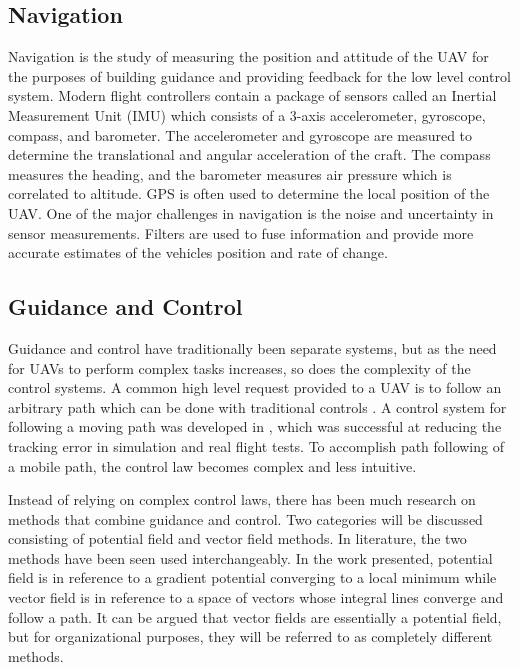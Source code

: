 \documentclass[numbered,pdftex]{ohio-etd}
\begin{document}
\subsection{Navigation}

Navigation is the study of measuring the position and attitude of the UAV for the purposes of building guidance and providing feedback for the low level control system. Modern flight controllers contain a package of sensors called an Inertial Measurement Unit (IMU) which consists of a 3-axis accelerometer, gyroscope, compass, and barometer. The accelerometer and gyroscope are measured to determine the translational and angular acceleration of the craft. The compass measures the heading, and the barometer measures air pressure which is correlated to altitude. GPS is often used to determine the local position of the UAV. One of the major challenges in navigation is the noise and uncertainty in sensor measurements. Filters are used to fuse information and provide more accurate estimates of the vehicles position and rate of change.


\subsection{Guidance and Control}

Guidance and control have traditionally been separate systems, but as the need for UAVs to perform complex tasks increases, so does the complexity of the control systems. A common high level request provided to a UAV is to follow an arbitrary path which can be done with traditional controls \cite{zhao_curved_2017}. A control system for following a moving path was developed in \cite{oliveira_moving_2016}, which was successful at reducing the tracking error in simulation and real flight tests. To accomplish path following of a mobile path, the control law becomes complex and less intuitive. 

Instead of relying on complex control laws, there has been much research on methods that combine guidance and control.  Two categories will be discussed consisting of potential field and vector field methods. In literature, the two methods have been seen used interchangeably. In the work presented, potential field is in reference to a gradient potential converging to a local minimum while vector field is in reference to a space of vectors whose integral lines converge and follow a path. It can be argued that vector fields are essentially a potential field, but for organizational purposes, they will be referred to as completely different methods. 
\end{document}
